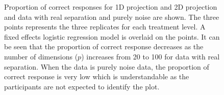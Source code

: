 \documentclass[12]{article}
\begin{document}
\begin{figure}[ht]
   \centering
      \caption{Proportion of correct responses for 1D projection and 2D projection and data with real separation and purely noise are shown. The three points represents the three replicates for each treatment level. A fixed effects logistic regression model is overlaid on the points. It can be seen that the proportion of correct response decreases as the number of dimensions ($p$) increases from 20 to 100 for data with real separation. When the data is purely noise data, the proportion of correct response is very low which is understandable as the participants are not expected to identify the plot.  }
       \label{suc-rate-glm}
\end{figure}

\end{document}
